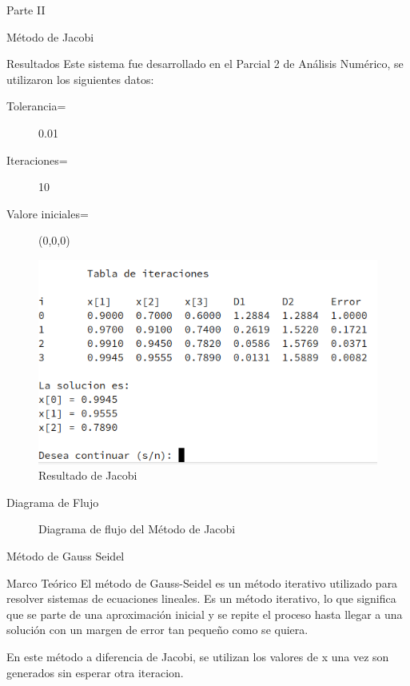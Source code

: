 \documentclass[legalpaper, 12pt]{article}
\begin{document}
\begin{section}{Parte II}
\begin{subsection}{Método de Jacobi}
\begin{subsubsection}{Resultados}
        Este sistema fue desarrollado en el Parcial 2 de Análisis Numérico,
        se utilizaron los siguientes datos:
        \begin{description}
          \item[Tolerancia=]0.01
          \item[Iteraciones=]10
          \item[Valore iniciales=](0,0,0)
        \end{description}
        \begin{figure}[h]
          \centering
          \includegraphics[scale=0.9]{jacobi.png}
          \caption{Resultado de Jacobi}
        \end{figure}
      \end{subsubsection}
      \newpage
      \begin{subsubsection}{Diagrama de Flujo}
        \begin{figure}[h]
          \centering
          
          \caption{Diagrama de flujo del Método de Jacobi}
        \end{figure}
      \end{subsubsection}
      \break
    \end{subsection}
    \begin{subsection}{Método de Gauss Seidel}
      \begin{subsubsection}{Marco Teórico}
        El método de Gauss-Seidel es un método iterativo utilizado para resolver
        sistemas de ecuaciones lineales. Es un método iterativo, lo que significa
        que se parte de una aproximación inicial y se repite el proceso hasta
        llegar a una solución con un margen de error tan pequeño como se quiera.

        En este método a diferencia de Jacobi, se utilizan los valores de x una
        vez son generados sin esperar otra iteracion.


\end{subsubsection}
\end{subsection}
\end{section}
\end{document}
